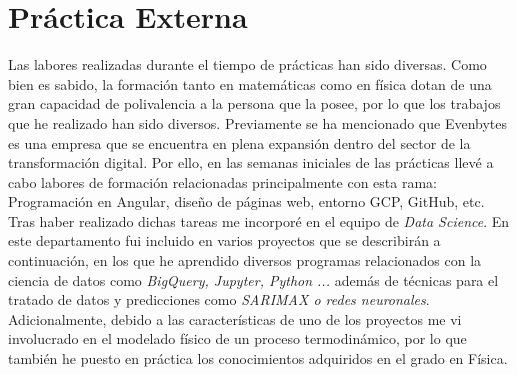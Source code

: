 \section{Práctica Externa} \label{practica externa}
%
%
Las labores realizadas durante el tiempo de prácticas han sido diversas. Como bien es sabido, la formación tanto en matemáticas como en física dotan de una gran capacidad de polivalencia a la persona que la posee, por lo que los trabajos que he realizado han sido diversos. Previamente se ha mencionado que Evenbytes es una empresa que se encuentra en plena expansión dentro del sector de la transformación digital. Por ello, en las semanas iniciales de las prácticas llevé a cabo labores de formación relacionadas principalmente con esta rama: Programación en Angular, diseño de páginas web, entorno GCP, GitHub, etc. Tras haber realizado dichas tareas me incorporé en el equipo de \textit{Data Science}. En este departamento fui incluido en varios proyectos que se describirán a continuación, en los que he aprendido diversos programas relacionados con la ciencia de datos como \textit{BigQuery, Jupyter, Python ...} además de técnicas para el tratado de datos y predicciones como \textit{SARIMAX o redes neuronales}. Adicionalmente, debido a las características de uno de los proyectos me vi involucrado en el modelado físico de un proceso termodinámico, por lo que también he puesto en práctica los conocimientos adquiridos en el grado en Física.